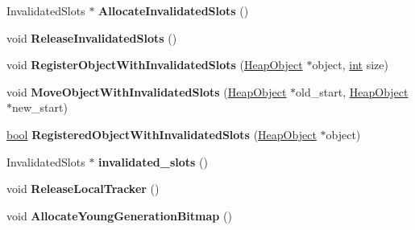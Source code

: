 \begin{DoxyCompactItemize}
\item 
\mbox{\label{classv8_1_1internal_1_1MemoryChunk_ae27c5433dca95ec5803141d2cc216edd}} 
Invalidated\+Slots $\ast$ {\bfseries Allocate\+Invalidated\+Slots} ()
\item 
\mbox{\label{classv8_1_1internal_1_1MemoryChunk_a6acd56e5e22c9cf75a5a2d0a19fa36e1}} 
void {\bfseries Release\+Invalidated\+Slots} ()
\item 
\mbox{\label{classv8_1_1internal_1_1MemoryChunk_a501213ffe5172b35152648871e41310c}} 
void {\bfseries Register\+Object\+With\+Invalidated\+Slots} (\mbox{\hyperlink{classv8_1_1internal_1_1HeapObject}{Heap\+Object}} $\ast$object, \mbox{\hyperlink{classint}{int}} size)
\item 
\mbox{\label{classv8_1_1internal_1_1MemoryChunk_aa3ab26a535d42fd41ec237c8714f38ff}} 
void {\bfseries Move\+Object\+With\+Invalidated\+Slots} (\mbox{\hyperlink{classv8_1_1internal_1_1HeapObject}{Heap\+Object}} $\ast$old\+\_\+start, \mbox{\hyperlink{classv8_1_1internal_1_1HeapObject}{Heap\+Object}} $\ast$new\+\_\+start)
\item 
\mbox{\label{classv8_1_1internal_1_1MemoryChunk_a57249c0e7e0b37cdcca2320f77d67215}} 
\mbox{\hyperlink{classbool}{bool}} {\bfseries Registered\+Object\+With\+Invalidated\+Slots} (\mbox{\hyperlink{classv8_1_1internal_1_1HeapObject}{Heap\+Object}} $\ast$object)
\item 
\mbox{\label{classv8_1_1internal_1_1MemoryChunk_a608390492fd40dee4d07f8a3d91af4a4}} 
Invalidated\+Slots $\ast$ {\bfseries invalidated\+\_\+slots} ()
\item 
\mbox{\label{classv8_1_1internal_1_1MemoryChunk_a467807be5b4313dc28991f1c11249026}} 
void {\bfseries Release\+Local\+Tracker} ()
\item 
\mbox{\label{classv8_1_1internal_1_1MemoryChunk_ad764b36a16fdcdf4593ab13635d236a1}} 
void {\bfseries Allocate\+Young\+Generation\+Bitmap} ()
\item 

\end{DoxyCompactItemize}

